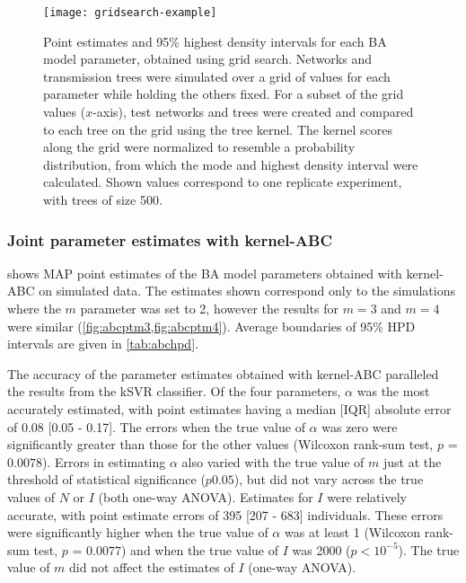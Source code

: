 \begin{figure}[ht]
  \centering
  \texttt{[image: gridsearch-example]}
  \caption[Grid search estimates of \gls{BA} model parameters.]{Point estimates
      and 95\% highest density intervals for each \gls{BA} model parameter,
      obtained using grid search. Networks and transmission trees were
      simulated over a grid of values for each parameter while holding the
      others fixed. For a subset of the grid values ($x$-axis), test networks
      and trees were created and compared to each tree on the grid using the
      tree kernel. The kernel scores along the grid were normalized to resemble
      a probability distribution, from which the mode and highest density
      interval were calculated. Shown values correspond to one replicate
      experiment, with trees of size 500.
  } 
  \label{fig:gridest}
\end{figure}

\subsubsection*{Joint parameter estimates with kernel-ABC}



 shows \gls{MAP} point estimates of the BA model parameters
obtained with kernel-ABC on simulated data. The estimates shown correspond only
to the simulations where the $m$ parameter was set to 2, however the results
for $m = 3$ and $m = 4$ were similar (\cref{fig:abcptm3,fig:abcptm4}). Average
boundaries of 95\% HPD intervals are given in \cref{tab:abchpd}.

The accuracy of the parameter estimates obtained with kernel-ABC
paralleled the results from the \gls{kSVR} classifier. Of the four parameters,
$\alpha$ was the most accurately estimated, with point estimates having a
median [IQR] absolute error of 
    0.08 
    [0.05 - 
    0.17].
The errors when the true value of $\alpha$ was zero were significantly greater
than those for the other values 
    (Wilcoxon rank-sum test, $p$ = $0.0078$).
Errors in estimating $\alpha$ also varied with the true value of $m$ just at
the threshold of statistical significance
    ($p 0.05$),
but did not vary across the true values of $N$ or $I$ (both one-way ANOVA).
Estimates for $I$ were relatively accurate, with point estimate errors of
    395 
    [207 - 
    683] individuals.
These errors were significantly higher when the true value of $\alpha$ was
at least 1
    (Wilcoxon rank-sum test, $p$ = $0.0077$)
and when the true value of $I$ was 2000 ($p < 10^{-5}$). The true value of $m$
did not affect the estimates of $I$ (one-way ANOVA).

